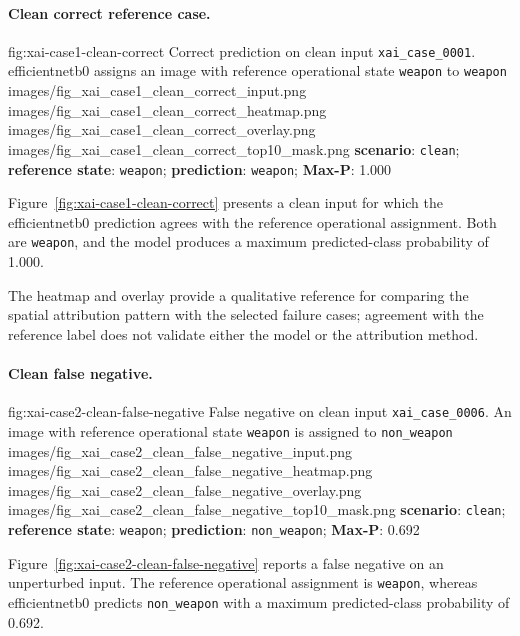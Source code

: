\paragraph{Clean correct reference case.}

\XAIcaseFigureMaskGrid
{fig:xai-case1-clean-correct}
{Correct prediction on clean input \texttt{xai\_case\_0001}. \gls{efficientnetb0}
assigns an image with reference operational state \texttt{weapon} to
\texttt{weapon}}
{images/fig_xai_case1_clean_correct_input.png}
{images/fig_xai_case1_clean_correct_heatmap.png}
{images/fig_xai_case1_clean_correct_overlay.png}
{images/fig_xai_case1_clean_correct_top10_mask.png}
{\textbf{scenario}: \texttt{clean};
\textbf{reference state}: \texttt{weapon};
\textbf{prediction}: \texttt{weapon};
\textbf{Max-P}: 1.000}

Figure~\ref{fig:xai-case1-clean-correct} presents a clean input for which the
\gls{efficientnetb0} prediction agrees with the reference operational assignment.
Both are \texttt{weapon}, and the model produces a maximum predicted-class
probability of 1.000.

The heatmap and overlay provide a qualitative reference for comparing the
spatial attribution pattern with the selected failure cases; agreement with the
reference label does not validate either the model or the attribution method.

\paragraph{Clean false negative.}

\XAIcaseFigureMaskGrid
{fig:xai-case2-clean-false-negative}
{False negative on clean input \texttt{xai\_case\_0006}. An image with
reference operational state \texttt{weapon} is assigned to
\texttt{non\_weapon}}
{images/fig_xai_case2_clean_false_negative_input.png}
{images/fig_xai_case2_clean_false_negative_heatmap.png}
{images/fig_xai_case2_clean_false_negative_overlay.png}
{images/fig_xai_case2_clean_false_negative_top10_mask.png}
{\textbf{scenario}: \texttt{clean};
\textbf{reference state}: \texttt{weapon};
\textbf{prediction}: \texttt{non\_weapon};
\textbf{Max-P}: 0.692}

Figure~\ref{fig:xai-case2-clean-false-negative} reports a false negative on an
unperturbed input. The reference operational assignment is \texttt{weapon},
whereas \gls{efficientnetb0} predicts \texttt{non\_weapon} with a maximum
predicted-class probability of 0.692.

